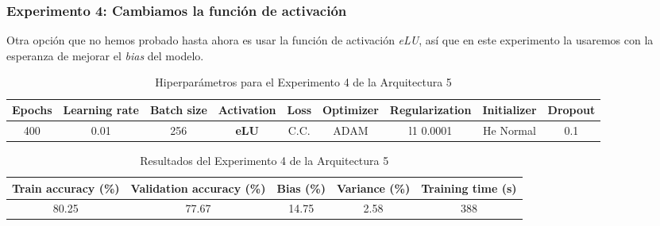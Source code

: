 \documentclass{article}
\begin{document}
		
		\subsubsection{Experimento 4: Cambiamos la funci\'on de activaci\'on}
		\label{d-s-a5-e4}
			Otra opci\'on que no hemos probado hasta ahora es usar la funci\'on de activaci\'on \textit{eLU}, as\'i que en este experimento la usaremos con la esperanza de mejorar el \textit{bias} del modelo.
		
			\begin{table}[!h]
				\begin{center}
					\begin{tabular}{| c | c | c | c | c | c | c | c | c |}
						\textbf{Epochs} & \textbf{Learning rate} & \textbf{Batch size} & \textbf{Activation} & \textbf{Loss} & \textbf{Optimizer} & \textbf{Regularization} & \textbf{Initializer} & \textbf{Dropout}\\ \hline
						 400 & 0.01 & 256 & \textbf{eLU} & C.C. & ADAM & l1 0.0001 & He Normal & 0.1
					\end{tabular}
					\caption{Hiperpar\'ametros para el Experimento 4 de la Arquitectura 5}
					\label{tab:hip-d-a5-e4}
				\end{center}
			\end{table}
			\begin{table}[!h]
				\begin{center}
					\begin{tabular}{| c | c | c | c | c |}
						\textbf{Train accuracy (\%)} & \textbf{Validation accuracy (\%)} & \textbf{Bias (\%)} & \textbf{Variance (\%)} & \textbf{Training time (s)} \\ \hline
						80.25 & 77.67 & 14.75 & 2.58 & 388\\ \hline
					\end{tabular}
					\caption{Resultados del Experimento 4 de la Arquitectura 5}
					\label{tab:res-d-a5-e4}
				\end{center}
			\end{table}
		    
\end{document}
